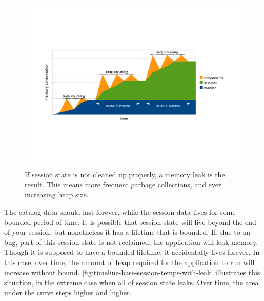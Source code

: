 \begin{figure}
	\centering
	\includegraphics[width=\textwidth]{Figures/lifetime/timeline-base-session-temps-with-leak}
	\caption{If session state is not cleaned up
	properly, a memory leak is the result. This means more frequent garbage
	collections, and ever increasing heap size.}
	\label{fig:timeline-base-session-temps-with-leak}
\end{figure}

The catalog data should last forever, while the
session data lives for some bounded period of time. It is possible that session
state will live beyond the end of your session, but nonetheless it has a
lifetime that is bounded. If, due to an bug, part of this session state is not
reclaimed, the application will leak memory. Though it is supposed to have a bounded lifetime, it
accidentally lives forever. In this case, over time, the amount of heap required
for the application to run will increase without bound.
\autoref{fig:timeline-base-session-temps-with-leak} illustrates this situation,
in the extreme case when all of session state leaks. Over time, the area under
the curve steps higher and higher.


